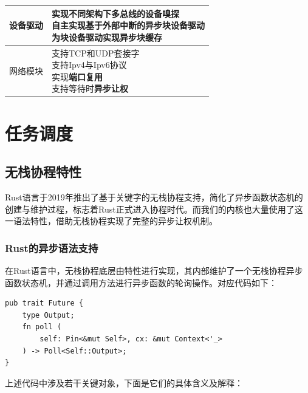\documentclass{article}
\newcommand{\defaultlinespread}{1.35}
\begin{document}
\begin{table}[H]
\begin{tabular}{p{3cm} p{9cm}}
    设备驱动&\parbox{9cm}{
        实现不同架构下\textbf{多总线的设备嗅探}\newline
        \textbf{自主}实现基于外部\textbf{中断}的\textbf{异步块设备驱动}\newline
        为块设备驱动实现\textbf{异步块缓存}
    }\\\midrule
    
    网络模块& \parbox{9cm}{
        支持TCP和UDP套接字\newline
        支持Ipv4与Ipv6协议\newline
        实现\textbf{端口复用}\newline
        支持等待时\textbf{异步让权}
    }\\\bottomrule
\end{tabular}
\end{table}

\newpage
\section{任务调度}
\subsection{无栈协程特性}

Rust语言于2019年推出了基于关键字的无栈协程支持，简化了异步函数状态机的创建与维护过程，标志着Rust正式进入协程时代。而我们的内核也大量使用了这一语法特性，借助无栈协程实现了完整的异步让权机制。

\subsubsection{Rust的异步语法支持}

在Rust语言中，无栈协程底层由特性进行实现，其内部维护了一个无栈协程异步函数状态机，并通过调用方法进行异步函数的轮询操作。对应代码如下：

\begin{lstlisting}
pub trait Future {
    type Output;
    fn poll (
        self: Pin<&mut Self>, cx: &mut Context<'_>
    ) -> Poll<Self::Output>;
}
\end{lstlisting}

上述代码中涉及若干关键对象，下面是它们的具体含义及解释：
\end{document}
